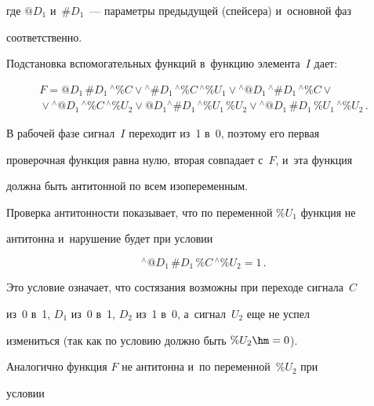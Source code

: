       где $@D_1$ и~$\#D_1$~--- параметры предыдущей (спейсера) и~основной фаз 


соответственно.


   


   Подстановка вспомогательных функций в~функцию элемента~$I$ дает:


\begin{multline*}


   F = @D_1 \,\#D_1\, {}^{\wedge}\%C \vee {}^{\wedge}\#D_1\, {}^{\wedge}\%C \,


{}^{\wedge}\%U_1 \vee {}^{\wedge}@D_1 \,{}^{\wedge}\#D_1 \,{}^{\wedge}\%C \vee {}\\


{}\vee 


{}^{\wedge}@D_1\, {}^{\wedge}\%C \,{}^{\wedge}\%U_2 \vee @D_1 {}^{\wedge}\#D_1 \,


{}^{\wedge}\%U_1\, \%U_2 \vee {}^{\wedge}@D_1 \,\#D_1\, \%U_1 \,{}^{\wedge}\%U_2\,.


   \end{multline*}


   


   В рабочей фазе сигнал~$I$ переходит из~1 в~0, поэтому его первая 


проверочная функция равна нулю, вторая совпадает с~$F$, и~эта функция 


должна быть антитонной по всем изопеременным.


   


   Проверка антитонности показывает, что по переменной $\%U_1$ функция не 


антитонна и~нарушение будет при условии


   $$


   {}^{\wedge}@D_1 \,\#D_1 \,\%C\, {}^{\wedge}\%U_2 = 1\,.


   $$


      Это условие означает, что состязания возможны при переходе сигнала~$C$ 


из~0 в~1, $D_1$ из~0 в~1, $D_2$ из~1 в~0, а~сигнал~$U_2$ еще не успел 


измениться (так как по условию должно быть $\%U_2 \hm= 0$).


   


   Аналогично функция $F$ не антитонна и~по переменной~$\%U_2$ при 


условии


